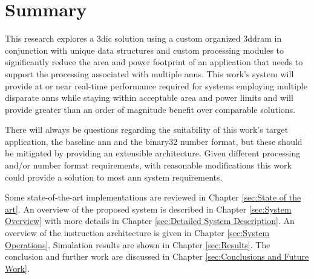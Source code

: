 \section[Summary]{Summary}
\label{sec:Summary}

This research explores a \ac{3dic} solution using a custom organized \ac{3ddram} in conjunction with unique data structures and custom processing modules to significantly reduce the 
area and power footprint of an application that needs to support the processing associated with multiple \ac{ann}s.
This work's system will provide at or near real-time performance required for systems employing multiple disparate \ac{ann}s while staying within acceptable area and power limits and will provide greater than an order of magnitude benefit over comparable solutions.

There will always be questions regarding the suitability of this work's target application, the baseline \ac{ann} and the \ac{binary32} number format, but these should be mitigated by providing an extensible architecture.
Given different processing and/or number format requirements, with reasonable modifications this work could provide a solution to most \ac{ann} system requirements.

\hfill %

\iffalse
An overview of \ac{3dic} technology is given in Chapter \ref{sec:3dic}.
An overview on the pros and cons of \ac{dram} and \ac{sram} along with some proposed \ac{dram} customizations are given in Chapter \ref{sec:DRAM Customizations}.
\fi
Some state-of-the-art implementations are reviewed in Chapter \ref{sec:State of the art}.
An overview of the proposed system is described in Chapter \ref{sec:System Overview} with more details in Chapter \ref{sec:Detailed System Description}.
An overview of the instruction architecture is given in Chapter \ref{sec:System Operations}.
Simulation results are shown in Chapter \ref{sec:Results}.
The conclusion and further work are discussed in Chapter \ref{sec:Conclusions and Future Work}.
